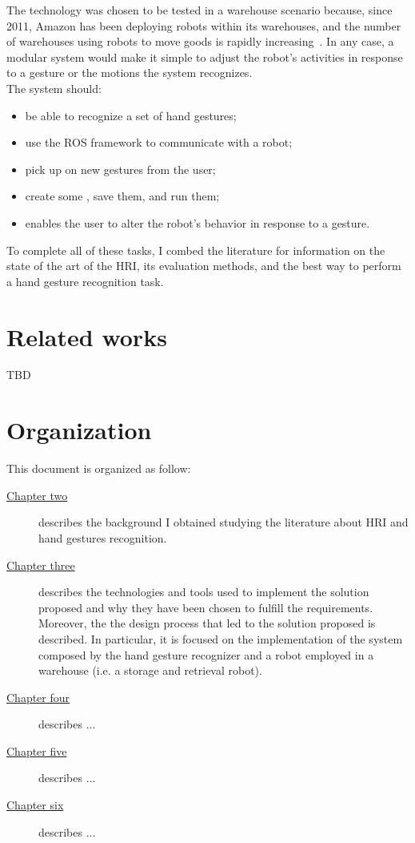 \documentclass[../thesis.tex]{subfiles}
\begin{document}
The technology was chosen to be tested in a warehouse scenario because, since 2011, Amazon has been deploying robots within its warehouses, and the number of warehouses using robots to move goods is rapidly increasing~\cite{paper:bogue2016}. In any case, a modular system would make it simple to adjust the robot's activities in response to a gesture or the motions the system recognizes.\\
The system should:
\begin{itemize}
    \item be able to recognize a set of hand gestures;
    \item use the \acrshort{ROS} framework to communicate with a robot;
    \item pick up on new gestures from the user;
    \item create some , save them, and run them;
    \item enables the user to alter the robot's behavior in response to a gesture.
\end{itemize}
To complete all of these tasks, I combed the literature for information on the state of the art of the \acrshort{HRI}, its evaluation methods, and the best way to perform a hand gesture recognition task.

\section{Related works}
TBD

\section{Organization}\label{s:organization}
This document is organized as follow:
\begin{description}
    \item[{\hyperref[cap:theory]{Chapter two}}] describes the background I obtained studying the literature about \acrlong{HRI} and hand gestures recognition.
    \item[{\hyperref[cap:methods]{Chapter three}}] describes the technologies and tools used to implement the solution proposed and why they have been chosen to fulfill the requirements. Moreover, the the design process that led to the solution proposed is described. In particular, it is focused on the implementation of the system composed by the hand gesture recognizer and a robot employed in a warehouse (i.e. a storage and retrieval robot).
    \item[{\hyperref[cap:results]{Chapter four}}] describes ...
    \item[{\hyperref[cap:discussion]{Chapter five}}] describes ...
    \item[{\hyperref[cap:conclusion]{Chapter six}}] describes ...
\end{description}
\end{document}
